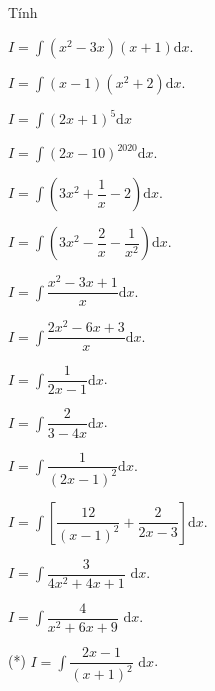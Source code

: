 \begin{vd}%
	Tính
    \begin{listEX}[3]
        \item $I=\displaystyle\int{(x^2-3x)(x+1)\text{d}x}$.
        \item $I=\displaystyle\int{(x-1)(x^2+2)\text{d}x}$.
        \item $I=\displaystyle\int{{{(2x+1)}^5}\text{d}x}$
        \item $I=\displaystyle\int{{{(2x-10)}^{2020}}\text{d}x}$.
        \item $I=\displaystyle\int{\left( 3x^2+\dfrac{1}{x}-2 \right)\text{d}x}$.
        \item $I=\displaystyle\int{\left( 3x^2-\dfrac{2}{x}-\dfrac{1}{x^2} \right)\text{d}x}$.
        \item $I=\displaystyle\int{\dfrac{x^2-3x+1}{x}\text{d}x}$.
        \item $I=\displaystyle\int{\dfrac{2x^2-6x+3}{x}\text{d}x}$.
        \item $I=\displaystyle\int{\dfrac{1}{2x-1}\text{d}x}$.
        \item $I=\displaystyle\int{\dfrac{2}{3-4x}\text{d}x}$.
        \item $I=\displaystyle\int{\dfrac{1}{{{\left( 2x-1 \right)}^2}}\text{d}x}$.
        \item $I=\displaystyle\int{\left[ \dfrac{12}{{{\left( x-1 \right)}^2}}+\dfrac{2}{2x-3} \right]\text{d}x}$.
        \item $I=\displaystyle\int{\dfrac{3}{4x^2+4x+1}\textrm{ d}x}$.
        \item $I=\displaystyle\int{\dfrac{4}{x^2+6x+9}\textrm{ d}x}$.
            \item (*) $I=\displaystyle\int{\dfrac{2x-1}{{{\left( x+1 \right)}^2}}\textrm{ d}x}$.
    \end{listEX}
\end{vd}
